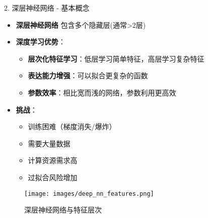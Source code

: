 \documentclass[
  ignorenonframetext,
  aspectratio=169,
  chinese-hans,
]{beamer}
\providecommand{\tightlist}{%
  \setlength{\itemsep}{0pt}\setlength{\parskip}{0pt}}\usepackage{longtable,booktabs,array}
\begin{document}
\begin{frame}{2. 深层神经网络 - 基本概念}
\label{ux6df1ux5c42ux795eux7ecfux7f51ux7edc---ux57faux672cux6982ux5ff5}
\begin{itemize}
\item
  \textbf{深层神经网络} 包含多个隐藏层(通常\textgreater2层)
\item
  \textbf{深度学习优势}：

  \begin{itemize}
  \tightlist
  \item
    \textbf{层次化特征学习}：低层学习简单特征，高层学习复杂特征
  \item
    \textbf{表达能力增强}：可以拟合更复杂的函数
  \item
    \textbf{参数效率}：相比宽而浅的网络，参数利用更高效
  \end{itemize}
\item
  \textbf{挑战}：

  \begin{itemize}
  \tightlist
  \item
    训练困难（梯度消失/爆炸）
  \item
    需要大量数据
  \item
    计算资源需求高
  \item
    过拟合风险增加
  \end{itemize}
\end{itemize}

\begin{figure}[H]

{\centering \texttt{[image: images/deep\_nn\_features.png]}

}

\caption{深层神经网络与特征层次}

\end{figure}%
\end{frame}
\end{document}
